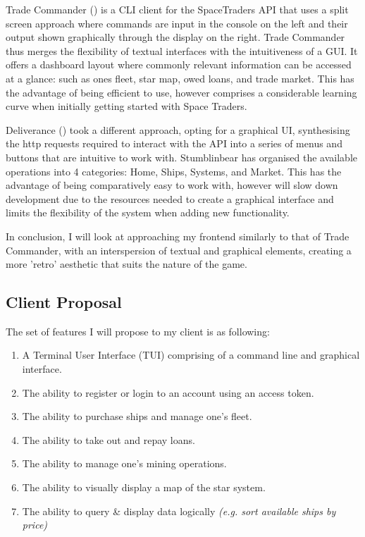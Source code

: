 
Trade Commander (\textcite{tradecommander}) is a CLI client for the SpaceTraders API that uses a split screen approach where commands are input in the console on the left and their output shown graphically through the display on the right. Trade Commander thus merges the flexibility of textual interfaces with the intuitiveness of a GUI. It offers a dashboard layout where commonly relevant information can be accessed at a glance: such as ones fleet, star map, owed loans, and trade market. This has the advantage of being efficient to use, however comprises a considerable learning curve when initially getting started with Space Traders.  

\bigskip
{}

Deliverance (\textcite{deliverance}) took a different approach, opting for a graphical UI, synthesising the http requests required to interact with the API into a series of menus and buttons that are intuitive to work with. Stumblinbear has organised the available operations into 4 categories: Home, Ships, Systems, and Market. This has the advantage of being comparatively easy to work with, however will slow down development due to the resources needed to create a graphical interface and limits the flexibility of the system when adding new functionality.

In conclusion, I will look at approaching my frontend similarly to that of Trade Commander, with an interspersion of textual and graphical elements, creating a more 'retro' aesthetic that suits the nature of the game. 

\subsection{Client Proposal}
The set of features I will propose to my client is as following:
\begin{enumerate}
    \item A Terminal User Interface (TUI) comprising of a command line and graphical interface.
    \item The ability to register or login to an account using an access token.
    \item The ability to purchase ships and manage one's fleet.
    \item The ability to take out and repay loans.
    \item The ability to manage one's mining operations.
    \item The ability to visually display a map of the star system.
    \item The ability to query \& display data logically \textit{(e.g. sort available ships by price)}
\end{enumerate}

